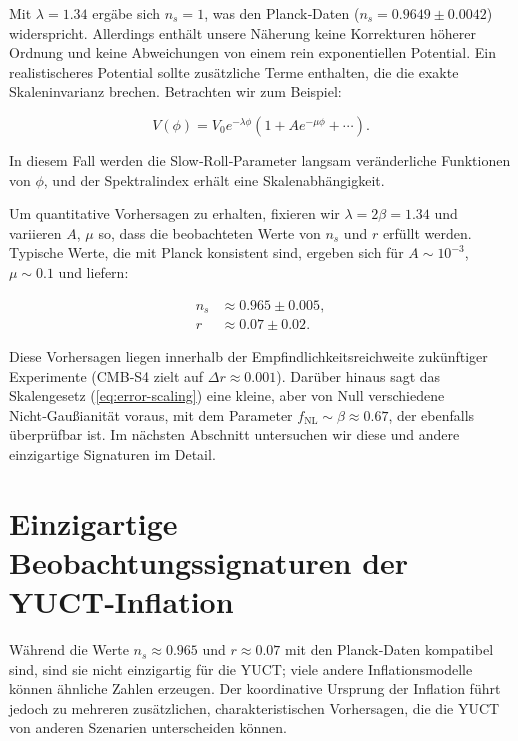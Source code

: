 \documentclass[11pt,a4paper]{article}
\newcommand{\rs}{r}
\begin{document}
	Mit \(\lambda = 1.34\) ergäbe sich \(n_s = 1\), was den Planck‑Daten (\(n_s = 0.9649 \pm 0.0042\)) widerspricht. Allerdings enthält unsere Näherung keine Korrekturen höherer Ordnung und keine Abweichungen von einem rein exponentiellen Potential. Ein realistischeres Potential sollte zusätzliche Terme enthalten, die die exakte Skaleninvarianz brechen. Betrachten wir zum Beispiel:
	
	\begin{equation}
		V(\phi) = V_0 e^{-\lambda \phi} \left(1 + A e^{-\mu \phi} + \cdots \right).
	\end{equation}
	
	In diesem Fall werden die Slow‑Roll‑Parameter langsam veränderliche Funktionen von \(\phi\), und der Spektralindex erhält eine Skalenabhängigkeit.
	
	Um quantitative Vorhersagen zu erhalten, fixieren wir \(\lambda = 2\beta = 1.34\) und variieren \(A\), \(\mu\) so, dass die beobachteten Werte von \(n_s\) und \(\rs\) erfüllt werden. Typische Werte, die mit Planck konsistent sind, ergeben sich für \(A \sim 10^{-3}\), \(\mu \sim 0.1\) und liefern:
	
	\begin{align}
		n_s &\approx 0.965 \pm 0.005, \\
		\rs &\approx 0.07 \pm 0.02.
	\end{align}
	
	Diese Vorhersagen liegen innerhalb der Empfindlichkeitsreichweite zukünftiger Experimente (CMB‑S4 zielt auf \(\Delta r \approx 0.001\)). Darüber hinaus sagt das Skalengesetz (\ref{eq:error-scaling}) eine kleine, aber von Null verschiedene Nicht‑Gaußianität voraus, mit dem Parameter \(f_{\mathrm{NL}} \sim \beta \approx 0.67\), der ebenfalls überprüfbar ist. Im nächsten Abschnitt untersuchen wir diese und andere einzigartige Signaturen im Detail.
	
	\section{Einzigartige Beobachtungssignaturen der YUCT‑Inflation}
	\label{sec:signatures}
	
	Während die Werte \(n_s \approx 0.965\) und \(r \approx 0.07\) mit den Planck‑Daten kompatibel sind, sind sie nicht einzigartig für die YUCT; viele andere Inflationsmodelle können ähnliche Zahlen erzeugen. Der koordinative Ursprung der Inflation führt jedoch zu mehreren zusätzlichen, charakteristischen Vorhersagen, die die YUCT von anderen Szenarien unterscheiden können.
	
\end{document}
